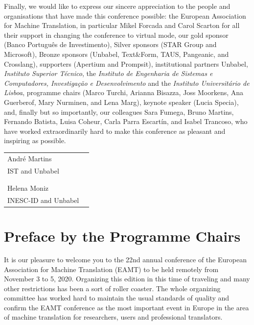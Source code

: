 \documentclass[a4paper,11pt,twoside]{book}
\begin{document}
Finally, we would like to express our sincere appreciation to the people and organisations that have made this conference possible: the European Association for Machine Translation, in particular Mikel Forcada and Carol Scarton for all their support in changing the conference to virtual mode, our gold sponsor (Banco Português de Investimento), Silver sponsors (STAR Group and Microsoft), Bronze sponsors (Unbabel, Text\&Form, TAUS, Pangeanic, and Crosslang), supporters (Apertium and Prompsit), institutional partners Unbabel, \emph{Instituto Superior Técnico}, the \emph{Instituto de Engenharia de Sistemas e Computadores, Investigação e Desenvolvimento} and the \emph{Instituto Universitário de Lisboa}, programme chairs (Marco Turchi, Arianna Bisazza, Joss Moorkens, Ana Guerberof, Mary Nurminen, and Lena Marg), keynote speaker (Lucia Specia), and, finally but so importantly, our colleagues Sara Fumega, Bruno Martins, Fernando Batista, Luisa Coheur, Carla Parra Escartín, and Isabel Trancoso, who have worked extraordinarily hard to make this conference as pleasant and inspiring as possible. 




\vspace{1cm}
\begin{center}
\begin{tabular}{ll}
André Martins\\
IST and Unbabel\\
\\
\\
Helena Moniz\\
INESC-ID and Unbabel\\
\end{tabular}
\end{center}


\chapter*{Preface by the Programme Chairs}

It is our pleasure to welcome you to the 22nd annual conference of the European Association for Machine Translation (EAMT) to be held remotely from November 3 to 5, 2020. Organizing this edition in this time of traveling and many other restrictions has been a sort of roller coaster. The whole organizing committee has worked hard to maintain the usual standards of quality and confirm the EAMT conference as the most important event in Europe in the area of machine translation for researchers, users and professional translators.
\end{document}

